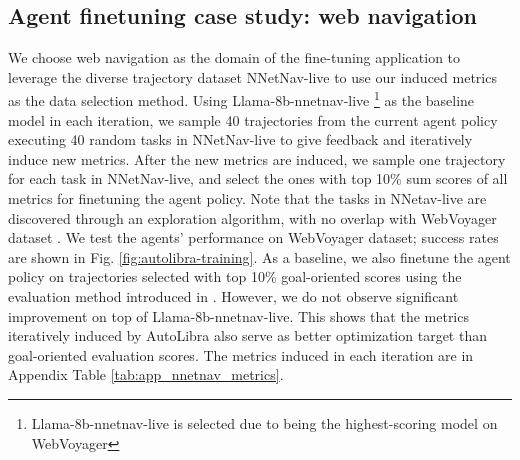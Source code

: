 \subsection{Agent finetuning case study: web navigation}
We choose web navigation as the domain of the fine-tuning application to leverage the diverse trajectory dataset NNetNav-live \citep{Murty2025NNetNav} to use our induced metrics as the data selection method. Using Llama-8b-nnetnav-live \footnote{Llama-8b-nnetnav-live is selected due to being the highest-scoring model on WebVoyager} as the baseline model in each iteration, we sample 40 trajectories from the current agent policy executing 40 random tasks in NNetNav-live to give feedback and iteratively induce new metrics. After the new metrics are induced, we sample one trajectory for each task in NNetNav-live, and select the ones with top 10\% sum scores of all metrics for finetuning the agent policy. Note that the tasks in NNetav-live are discovered through an exploration algorithm, with no overlap with WebVoyager dataset \citep{he2024webvoyager}. We test the agents' performance on WebVoyager dataset; success rates are shown in Fig. \ref{fig:autolibra-training}. As a baseline, we also finetune the agent policy on trajectories selected with top 10\% goal-oriented scores using the evaluation method introduced in \citep{pan2024autonomous}. However, we do not observe significant improvement on top of Llama-8b-nnetnav-live. This shows that the metrics iteratively induced by AutoLibra also serve as better optimization target than goal-oriented evaluation scores. The metrics induced in each iteration are in Appendix Table \ref{tab:app_nnetnav_metrics}.